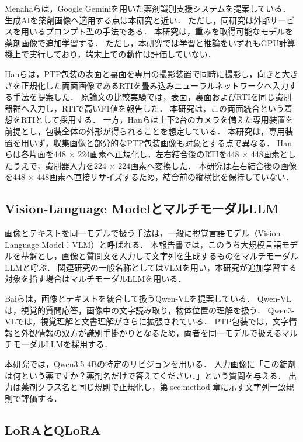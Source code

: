 \documentclass[uplatex,dvipdfmx]{jsarticle}
\begin{document}
Menahaらは，Google Geminiを用いた薬剤識別支援システムを提案している\cite{menaha2024gemini}．
生成AIを薬剤画像へ適用する点は本研究と近い．
ただし，同研究は外部サービスを用いるプロンプト型の手法である．
本研究は，重みを取得可能なモデルを薬剤画像で追加学習する．
ただし，本研究では学習と推論をいずれもGPU計算機上で実行しており，端末上での動作は評価していない．

Hanらは，PTP包装の表面と裏面を専用の撮影装置で同時に撮影し，向きと大きさを正規化した両面画像であるRTIを畳み込みニューラルネットワークへ入力する手法を提案した\cite{han2021blister}．
原論文の比較実験では，表面，裏面およびRTIを同じ識別器群へ入力し，RTIで高いF1値を報告した．
本研究は，この両面統合という着想をRTIとして採用する．
一方，Hanらは上下2台のカメラを備えた専用装置を前提とし，包装全体の外形が得られることを想定している．
本研究は，専用装置を用いず，収集画像と部分的なPTP包装画像も対象とする点で異なる．
Hanらは各片面を448 $\times$ 224画素へ正規化し，左右結合後のRTIを448 $\times$ 448画素としたうえで，識別器入力を224 $\times$ 224画素へ変換した．
本研究は左右結合後の画像を448 $\times$ 448画素へ直接リサイズするため，結合前の縦横比を保持していない．

\subsection{Vision-Language Modelとマルチモーダル\mbox{LLM}}\label{sec:vlm}

画像とテキストを同一モデルで扱う手法は，一般に視覚言語モデル（Vision-Language Model：VLM）と呼ばれる．
本報告書では，このうち大規模言語モデルを基盤とし，画像と質問文を入力して文字列を生成するものをマルチモーダルLLMと呼ぶ．
関連研究の一般名称としてはVLMを用い，本研究が追加学習する対象を指す場合はマルチモーダルLLMを用いる．

Baiらは，画像とテキストを統合して扱うQwen-VLを提案している\cite{bai2023qwenvl}．
Qwen-VLは，視覚的質問応答，画像中の文字読み取り，物体位置の理解を扱う．
Qwen3-VLでは，視覚理解と文書理解がさらに拡張されている\cite{qwen3vl2025}．
PTP包装では，文字情報と外観情報の双方が識別手掛かりとなるため，両者を同一モデルで扱えるマルチモーダルLLMを採用する．

本研究では，Qwen3.5-4Bの特定のリビジョンを用いる\cite{qwen35model}．
入力画像に「この錠剤は何という薬ですか？薬剤名だけで答えてください．」という質問を与える．
出力は薬剤クラス名と同じ規則で正規化し，第\ref{sec:method}章に示す文字列一致規則で評価する．

\subsection{LoRAとQLoRA}
\end{document}
